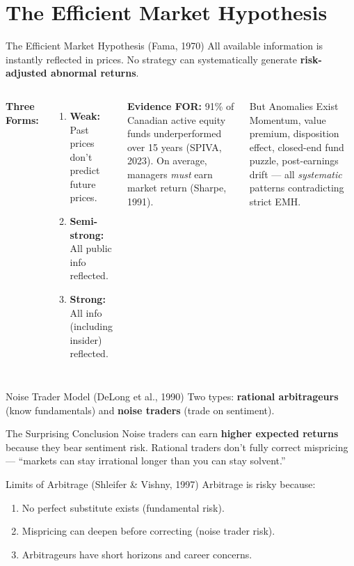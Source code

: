 \documentclass[aspectratio=169]{beamer}
\begin{document}
\section{The Efficient Market Hypothesis}

\begin{frame}{The Efficient Market Hypothesis (Fama, 1970)}
All available information is instantly reflected in prices. No strategy can systematically generate \textbf{risk-adjusted abnormal returns}.
\begin{columns}
\textcolor{beblue}{\textbf{Three Forms:}}
\begin{enumerate}\small
  \item \textbf{Weak:} Past prices don't predict future prices.
  \item \textbf{Semi-strong:} All public info reflected.
  \item \textbf{Strong:} All info (including insider) reflected.
\end{enumerate}
\textcolor{beteal}{\textbf{Evidence FOR:}} 91\% of Canadian active equity funds underperformed over 15 years (SPIVA, 2023). On average, managers \textit{must} earn market return (Sharpe, 1991).
\begin{alertblock}{But Anomalies Exist}
Momentum, value premium, disposition effect, closed-end fund puzzle, post-earnings drift --- all \textit{systematic} patterns contradicting strict EMH.
\end{alertblock}
\end{columns}
\end{frame}

\begin{frame}{Noise Trader Model (DeLong et al., 1990)}
Two types: \textbf{rational arbitrageurs} (know fundamentals) and \textbf{noise traders} (trade on sentiment).
\begin{alertblock}{The Surprising Conclusion}
Noise traders can earn \textbf{higher expected returns} because they bear sentiment risk. Rational traders don't fully correct mispricing --- ``markets can stay irrational longer than you can stay solvent.''
\end{alertblock}
\begin{exampleblock}{Limits of Arbitrage (Shleifer \& Vishny, 1997)}
Arbitrage is risky because:
\begin{enumerate}\small
  \item No perfect substitute exists (fundamental risk).
  \item Mispricing can deepen before correcting (noise trader risk).
  \item Arbitrageurs have short horizons and career concerns.
\end{enumerate}
\end{exampleblock}
\end{frame}
\end{document}
